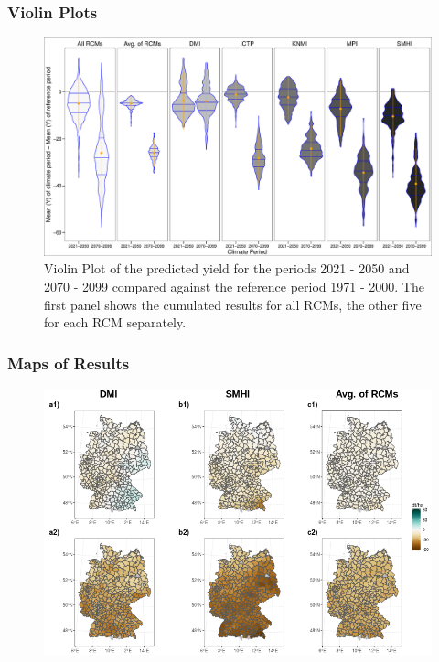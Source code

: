 \documentclass[12pt]{iopart}
\begin{document}
\subsubsection{Violin Plots}
\begin{figure}
	\label{violin:1f}
	\centering
	\includegraphics[width=1\textwidth]{figures/ViolinPlot_meanMinusMean.pdf}
	\caption{Violin Plot of the predicted yield for the periods 2021 - 2050 and 2070 - 2099 compared against the reference period 1971 - 2000. The first panel shows the cumulated results for all RCMs, the other five for each RCM separately.}
\end{figure}

\subsubsection{Maps of Results}
\begin{figure}
	\label{map:1f}
	\centering
	\includegraphics[width=1\textwidth]{figures/plot_mean_yield_SMI_6_Jun_Aug_ExtremesAndAvg.png}
	\caption{}
\end{figure}
\end{document}
